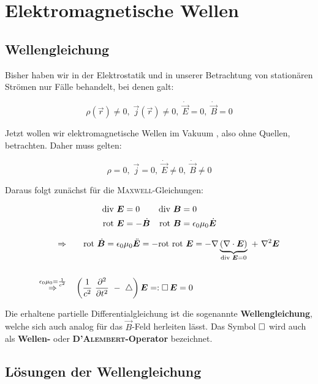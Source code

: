 \chapter{Elektromagnetische Wellen}

\section{Wellengleichung}

Bisher haben wir in der Elektrostatik und in unserer Betrachtung von stationären Strömen nur Fälle behandelt, bei denen galt:

\begin{equation*}
\rho(\vec{r})\neq 0,\; \vec{j}(\vec{r})\neq 0,\; \dot{\vec{E}}=0,\; \dot{\vec{B}}=0
\end{equation*}

Jetzt wollen wir elektromagnetische Wellen im Vakuum , also ohne Quellen, betrachten. Daher muss gelten: 

\begin{equation*}
\rho=0,\; \vec{j}=0,\; \dot{\vec{E}}\neq 0,\; \dot{\vec{B}}\neq 0
\end{equation*}

Daraus folgt zunächst für die \textsc{Maxwell}-Gleichungen:

\begin{align*}
\text{div } \bm{E} &=0 &\text{div } \bm{B} &= 0\\
\text{rot }  \bm{E} &= -\dot{\bm{B}} &\text{rot } \bm{B} &= \epsilon_0\mu_0 \dot{\bm{E}}\\
\end{align*}

\begin{align*}
\Rightarrow & \qquad \text{rot }\dot{\bm{B}} = \epsilon_0\mu_0\ddot{\bm{E}} = -\text{rot }\text{rot }\bm{E} = -\nabla\underbrace{(\nabla\cdot\bm{E})}_{\text{div }\bm{E}=0} \ + \ \nabla^2 \bm{E}\\
\ \\
\overset{\epsilon_0\mu_0 = \frac{1}{c^2}}{\Rightarrow} &\quad \left(\frac{1}{c^2} \ \frac{\partial ^2{}}{\partial{t}^2} \ - \ \mathop{{}\bigtriangleup}\nolimits\right)\bm{E} =: \mathop{{}\Box}\nolimits\bm{E} = 0
\end{align*}

Die erhaltene partielle Differentialgleichung ist die sogenannte \textbf{Wellengleichung}, welche sich auch analog für das $\vec{B}$-Feld herleiten lässt. Das Symbol $\mathop{{}\Box}\nolimits$ wird auch als \textbf{Wellen-} oder \textbf{\textsc{D'Alembert}-Operator} bezeichnet.


\section{Lösungen der Wellengleichung}

